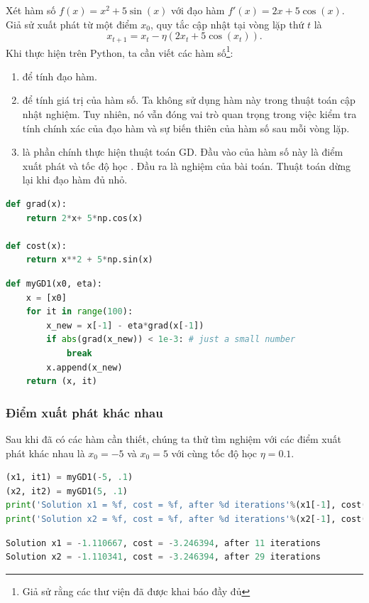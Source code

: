 Xét hàm số $f(x) = x^2 + 5\sin(x)$ với đạo hàm $f'(x) = 2x + 5\cos(x)$. Giả sử
xuất phát từ một điểm $x_{0}$, quy tắc cập nhật tại vòng lặp thứ $t$ là
\begin{equation} 
x_{t+1} = x_t - \eta(2x_t + 5\cos(x_t)). 
\end{equation} 
Khi thực hiện trên Python, ta cần viết các hàm số\footnote{Giả sử rằng các thư
viện đã được khai báo đầy đủ}:
\begin{enumerate}
    \item {} để tính đạo hàm. 

    \item  {} để tính giá trị của hàm số. Ta không sử dụng hàm này trong thuật toán cập nhật nghiệm. Tuy nhiên, nó vẫn đóng vai trò quan trọng trong việc kiểm tra tính chính xác của đạo hàm và sự biến thiên của hàm số sau mỗi vòng lặp.

    \item {} là phần chính thực hiện thuật toán GD. Đầu vào
    của hàm số này là điểm xuất phát  và tốc độ học
    . Đầu ra là nghiệm của bài toán. Thuật toán dừng lại khi
    đạo hàm đủ nhỏ.
\end{enumerate}
 
 
\begin{lstlisting}[language=Python]
def grad(x): 
    return 2*x+ 5*np.cos(x) 
 
def cost(x): 
    return x**2 + 5*np.sin(x) 
\end{lstlisting}

\begin{lstlisting}[language=Python]
def myGD1(x0, eta): 
    x = [x0] 
    for it in range(100): 
        x_new = x[-1] - eta*grad(x[-1]) 
        if abs(grad(x_new)) < 1e-3: # just a small number 
            break 
        x.append(x_new) 
    return (x, it) 
\end{lstlisting}
 
 
 
\subsubsection{Điểm xuất phát khác nhau}
 
Sau khi đã có các hàm cần thiết, chúng ta thử tìm nghiệm với các điểm xuất phát
khác nhau là $x_{0} = -5$ và $x_{0} = 5$ với cùng tốc độ học $\eta = 0.1$.
 
\begin{lstlisting}[language=Python]
(x1, it1) = myGD1(-5, .1) 
(x2, it2) = myGD1(5, .1) 
print('Solution x1 = %f, cost = %f, after %d iterations'%(x1[-1], cost(x1[-1]), it1)) 
print('Solution x2 = %f, cost = %f, after %d iterations'%(x2[-1], cost(x2[-1]), it2)) 
\end{lstlisting}
\kq 
\begin{lstlisting}[language=Python]
Solution x1 = -1.110667, cost = -3.246394, after 11 iterations 
Solution x2 = -1.110341, cost = -3.246394, after 29 iterations 
\end{lstlisting} 
  
